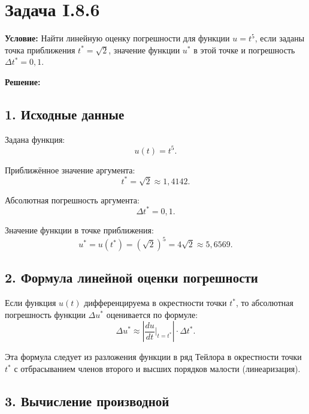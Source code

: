 \documentclass{article}
\begin{document}
\section*{Задача I.8.6}

\textbf{Условие:} Найти линейную оценку погрешности для функции $u = t^5$, если заданы точка приближения $t^* = \sqrt{2}$, значение функции $u^*$ в этой точке и погрешность $\Delta t^* = 0{,}1$.

\vspace{0.5cm}
\textbf{Решение:}

\subsection*{1. Исходные данные}

Задана функция:
\begin{equation}
u(t) = t^5.
\end{equation}

Приближённое значение аргумента:
\begin{equation}
t^* = \sqrt{2} \approx 1{,}4142.
\end{equation}

Абсолютная погрешность аргумента:
\begin{equation}
\Delta t^* = 0{,}1.
\end{equation}

Значение функции в точке приближения:
\begin{equation}
u^* = u(t^*) = (\sqrt{2})^5 = 4\sqrt{2} \approx 5{,}6569.
\end{equation}

\subsection*{2. Формула линейной оценки погрешности}

Если функция $u(t)$ дифференцируема в окрестности точки $t^*$, то абсолютная погрешность функции $\Delta u^*$ оценивается по формуле:
\begin{equation}
\Delta u^* \approx \left| \frac{du}{dt}\bigg|_{t = t^*} \right| \cdot \Delta t^*.
\label{eq:lin_err_86}
\end{equation}

Эта формула следует из разложения функции в ряд Тейлора в окрестности точки $t^*$ с отбрасыванием членов второго и высших порядков малости (линеаризация).

\subsection*{3. Вычисление производной}
\end{document}
